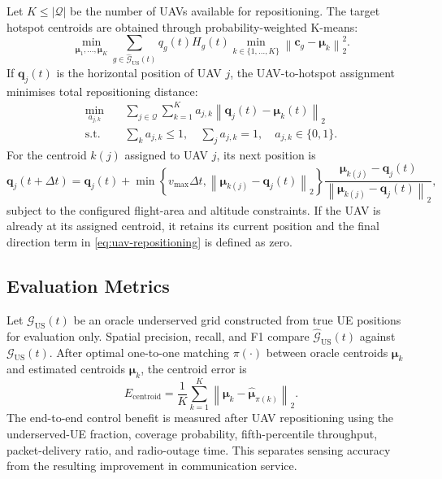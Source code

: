 Let $K\leq|\mathcal{Q}|$ be the number of UAVs available for
repositioning. The target hotspot centroids are obtained through
probability-weighted K-means:
\begin{equation}
 \min_{\boldsymbol{\mu}_1,\ldots,\boldsymbol{\mu}_K}
 \sum_{g\in\widehat{\mathcal{G}}_{\mathrm{US}}(t)}
 q_g(t)H_g(t)
 \min_{k\in\{1,\ldots,K\}}
 \left\|\mathbf{c}_g-\boldsymbol{\mu}_k\right\|_2^2.
 \label{eq:weighted-kmeans}
\end{equation}
If $\mathbf{q}_j(t)$ is the horizontal position of UAV $j$, the
UAV-to-hotspot assignment minimises total repositioning distance:
\begin{align}
 \min_{a_{j,k}}\quad&
 \sum_{j\in\mathcal{Q}}\sum_{k=1}^{K}
 a_{j,k}\left\|\mathbf{q}_j(t)-\boldsymbol{\mu}_k(t)\right\|_2
 \label{eq:uav-assignment-objective}\\
 \mathrm{s.t.}\quad&
 \sum_k a_{j,k}\leq1,\quad
 \sum_j a_{j,k}=1,\quad
 a_{j,k}\in\{0,1\}.
 \label{eq:uav-assignment-constraints}
\end{align}
For the centroid $k(j)$ assigned to UAV $j$, its next position is
\begin{equation}
 \mathbf{q}_j(t+\Delta t)=\mathbf{q}_j(t)+
 \min\!\left\{v_{\max}\Delta t,
 \left\|\boldsymbol{\mu}_{k(j)}-\mathbf{q}_j(t)\right\|_2\right\}
 \frac{\boldsymbol{\mu}_{k(j)}-\mathbf{q}_j(t)}
 {\left\|\boldsymbol{\mu}_{k(j)}-\mathbf{q}_j(t)\right\|_2},
 \label{eq:uav-repositioning}
\end{equation}
subject to the configured flight-area and altitude constraints.
If the UAV is already at its assigned centroid, it retains its current
position and the final direction term in \eqref{eq:uav-repositioning}
is defined as zero.

\subsection{Evaluation Metrics}

Let $\mathcal{G}_{\mathrm{US}}(t)$ be an oracle underserved grid
constructed from true UE positions for evaluation only. Spatial
precision, recall, and F1 compare
$\widehat{\mathcal{G}}_{\mathrm{US}}(t)$ against
$\mathcal{G}_{\mathrm{US}}(t)$. After optimal one-to-one matching
$\pi(\cdot)$ between oracle centroids $\boldsymbol{\mu}_k$ and
estimated centroids $\widehat{\boldsymbol{\mu}}_k$, the centroid error
is
\begin{equation}
 E_{\mathrm{centroid}}=
 \frac{1}{K}\sum_{k=1}^{K}
 \left\|\boldsymbol{\mu}_k-
 \widehat{\boldsymbol{\mu}}_{\pi(k)}\right\|_2.
 \label{eq:centroid-error-final}
\end{equation}
The end-to-end control benefit is measured after UAV repositioning
using the underserved-UE fraction, coverage probability,
fifth-percentile throughput, packet-delivery ratio, and radio-outage
time. This separates sensing accuracy from the resulting improvement
in communication service.
